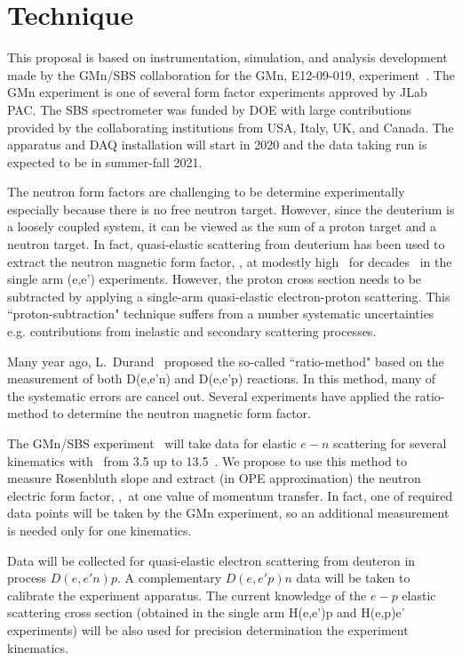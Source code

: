 \section{Technique}
\label{exp_method}
%
This proposal is based on instrumentation, simulation, and analysis development made by the GMn/SBS collaboration for the GMn, E12-09-019, experiment~\cite{E12-09-019}.
The GMn experiment is one of several form factor experiments approved by JLab PAC. 
The SBS spectrometer was funded by DOE with large contributions provided by the collaborating institutions from USA, Italy, UK, and Canada. 
The apparatus and DAQ installation will start in 2020 and the data taking run is expected to be in summer-fall 2021.

The neutron form factors are challenging to be determine experimentally especially because there is no free neutron target. 
However, since the deuterium is a loosely coupled system, it can be viewed as the sum of a proton target and a neutron target. 
In fact, quasi-elastic scattering from deuterium has been used to extract the neutron magnetic form factor, \gmn, at modestly high \qsq~for decades~\cite{Hughes:1965zza, Arnold:1988us} in the single arm (e,e') experiments. 
However, the proton cross section needs to be subtracted by applying a single-arm quasi-elastic electron-proton scattering. 
This ``proton-subtraction" technique suffers from a number systematic uncertainties e.g. contributions from inelastic and secondary scattering processes. 

Many year ago, L.~Durand~\cite{Durand:1959zz} proposed the so-called ``ratio-method" based on the measurement of both D(e,e'n) and D(e,e'p) reactions. 
In this method, many of the systematic errors are cancel out. 
Several experiments \cite{Bruins:1995ns, Kubon:2001rj, Lachniet:2008qf} have applied the ratio-method to determine the neutron magnetic form factor.

The GMn/SBS experiment~\cite{E12-09-019} will take data for elastic $e-n$ scattering for several kinematics with \qsq~from 3.5 up to 13.5~\gevcsq.
We propose to use this method to measure Rosenbluth slope and extract (in OPE approximation) the neutron electric form factor, \gen,~at one value of momentum transfer.
In fact, one of required data points will be taken by the GMn experiment, so an additional measurement is needed only for one
kinematics.

Data will be collected for quasi-elastic electron scattering from deuteron in process $D(e,e'n)p$. 
A complementary $D(e,e'p)n$ data will be taken to calibrate the experiment apparatus.
The current knowledge of the $e-p$ elastic scattering cross section (obtained in the single arm H(e,e')p and H(e,p)e' experiments) will be also used
for precision determination the experiment kinematics.

